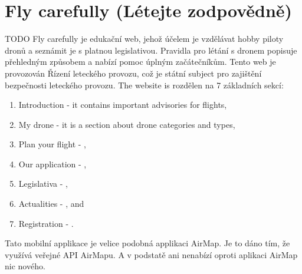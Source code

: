 \section{Fly carefully (L{\' e}tejte zodpov{\v e}dn{\v e})}\label{sec:fly-carefully}
TODO
Fly carefully je edukační web, jehož účelem je vzdělávat hobby piloty dronů a seznámit je s platnou legislativou.
Pravidla pro létání s dronem popisuje přehledným způsobem a nabízí pomoc úplným začátečníkům.
Tento web je provozován Řízení leteckého provozu, což je státní subject pro zajištění bezpečnosti leteckého provozu.
The website is rozdělen na 7 základních sekcí:
\begin{enumerate}
    \item Introduction - it contains important advisories for flights,
    \item My drone - it is a section about drone categories and types,
    \item Plan your flight - ,
    \item Our application - ,
    \item Legislativa - ,
    \item Actualities - , and
    \item Registration - .\cite{}%
\end{enumerate}
Tato mobilní applikace je velice podobná applikaci AirMap.
Je to dáno tím, že využívá veřejné API AirMapu.
A v podstatě ani nenabízí oproti aplikaci AirMap nic nového.
